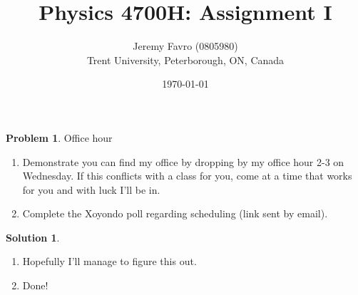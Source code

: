 \documentclass[10pt]{article}
\title{Physics 4700H: Assignment I}
\author{Jeremy Favro (0805980) \\ Trent University, Peterborough, ON, Canada}
\date{\today}
\theoremstyle{definition}
\newtheorem{problem}{Problem}
\newtheorem{soln}{Solution}
\begin{document}
\maketitle

\begin{problem} Office hour
\begin{enumerate}[label=(\alph*)]
  \item Demonstrate you can find my office by dropping by my office hour 2-3 on Wednesday. If
        this conflicts with a class for you, come at a time that works for you and with luck I'll be in.
  \item Complete the Xoyondo poll regarding scheduling (link sent by email).
\end{enumerate}
\end{problem}
\begin{soln}
  \begin{enumerate}[label=(\alph*)]
    \item Hopefully I'll manage to figure this out.
    \item Done!
  \end{enumerate}
\end{soln}
\end{document}
